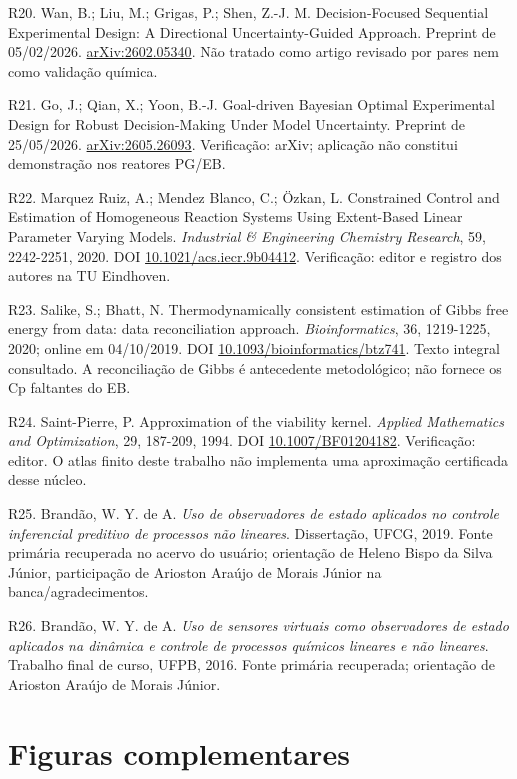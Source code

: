 \documentclass[
  11pt,
  letterpaper,
]{article}
\begin{document}
R20. Wan, B.; Liu, M.; Grigas, P.; Shen, Z.-J. M. Decision-Focused
Sequential Experimental Design: A Directional Uncertainty-Guided
Approach. Preprint de 05/02/2026.
\href{https://arxiv.org/abs/2602.05340}{arXiv:2602.05340}. Não tratado
como artigo revisado por pares nem como validação química.

R21. Go, J.; Qian, X.; Yoon, B.-J. Goal-driven Bayesian Optimal
Experimental Design for Robust Decision-Making Under Model Uncertainty.
Preprint de 25/05/2026.
\href{https://arxiv.org/abs/2605.26093}{arXiv:2605.26093}. Verificação:
arXiv; aplicação não constitui demonstração nos reatores PG/EB.

R22. Marquez Ruiz, A.; Mendez Blanco, C.; Özkan, L. Constrained Control
and Estimation of Homogeneous Reaction Systems Using Extent-Based Linear
Parameter Varying Models. \emph{Industrial \& Engineering Chemistry
Research}, 59, 2242-2251, 2020. DOI
\href{https://doi.org/10.1021/acs.iecr.9b04412}{10.1021/acs.iecr.9b04412}.
Verificação: editor e registro dos autores na TU Eindhoven.

R23. Salike, S.; Bhatt, N. Thermodynamically consistent estimation of
Gibbs free energy from data: data reconciliation approach.
\emph{Bioinformatics}, 36, 1219-1225, 2020; online em 04/10/2019. DOI
\href{https://doi.org/10.1093/bioinformatics/btz741}{10.1093/bioinformatics/btz741}.
Texto integral consultado. A reconciliação de Gibbs é antecedente
metodológico; não fornece os Cp faltantes do EB.

R24. Saint-Pierre, P. Approximation of the viability kernel.
\emph{Applied Mathematics and Optimization}, 29, 187-209, 1994. DOI
\href{https://doi.org/10.1007/BF01204182}{10.1007/BF01204182}.
Verificação: editor. O atlas finito deste trabalho não implementa uma
aproximação certificada desse núcleo.

R25. Brandão, W. Y. de A. \emph{Uso de observadores de estado aplicados
no controle inferencial preditivo de processos não lineares}.
Dissertação, UFCG, 2019. Fonte primária recuperada no acervo do usuário;
orientação de Heleno Bispo da Silva Júnior, participação de Arioston
Araújo de Morais Júnior na banca/agradecimentos.

R26. Brandão, W. Y. de A. \emph{Uso de sensores virtuais como
observadores de estado aplicados na dinâmica e controle de processos
químicos lineares e não lineares}. Trabalho final de curso, UFPB, 2016.
Fonte primária recuperada; orientação de Arioston Araújo de Morais
Júnior.

\hypertarget{figuras-complementares}{%
\section{Figuras complementares}\label{figuras-complementares}}
\end{document}
